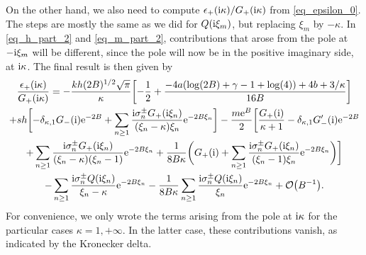 \documentclass[a4paper,11pt]{article}
\theoremstyle{definition}
\newcommand{\re}{{\rm e}}
\newcommand{\ri}{{\rm i}}
\begin{document}
On the other hand, we also need to compute $\epsilon_+(\ri\kappa)/G_+(\ri\kappa)$ from \eqref{eq_epsilon_0}. The steps are mostly the same as we did for $Q(\ri\xi_m)$, but replacing $\xi_m$ by $-\kappa$. In \eqref{eq_h_part_2} and \eqref{eq_m_part_2}, contributions that arose from the pole at $-\ri\xi_m$ will be different, since the pole will now be in the positive imaginary side, at $\ri\kappa$. The final result is then given by
\begin{multline}
\frac{\epsilon_+(\ri\kappa)}{G_+(\ri\kappa)} = -\frac{kh(2B)^{1/2}\sqrt{\pi}}{\kappa} \biggl[ -\frac{1}{2} + \frac{-4 a (\log(2B)+\gamma -1+\log (4))+4 b+3/\kappa}{16 B}  \biggr]\\
+s h\biggl[ - \delta_{\kappa,1} G_-(\ri)\re^{-2B} + \sum_{n\ge 1} \frac{\ri \sigma^\pm_n G_+(\ri\xi_n)}{(\xi_n-\kappa)\xi_n} \re^{-2B\xi_n} \biggr]
-\frac{m\re^B}{2}\biggl[\frac{G_+(\ri)}{\kappa+1} - \delta_{\kappa,1} G_-'(\ri)\re^{-2B}\\
+ \sum_{n\ge 1} \frac{\ri \sigma^\pm_n G_+(\ri\xi_n)}{(\xi_n-\kappa)(\xi_n-1)} \re^{-2B\xi_n}
+ \frac{1}{8B\kappa}\biggl( G_+(\ri) + \sum_{n\ge 1}\frac{\ri\sigma^\pm_n G_+(\ri\xi_n)}{(\xi_n-1)\xi_n} \re^{-2B\xi_n} \biggr) \biggr]\\
- \sum_{n\ge 1} \frac{\ri\sigma^\pm_n Q(\ri\xi_n)}{\xi_n-\kappa} \re^{-2B\xi_n} - \frac{1}{8 B \kappa} \sum_{n\ge 1} \frac{\ri \sigma^\pm_n Q(\ri\xi_n)}{\xi_n}\re^{-2B\xi_n} + \mathcal{O}\big( B^{-1} \big).
\label{eq_epsilon_kappa}
\end{multline}
For convenience, we only wrote the terms arising from the pole at $\ri\kappa$ for the particular cases $\kappa=1, +\infty$. In the latter case, these contributions vanish, as indicated by the Kronecker delta.
\end{document}

